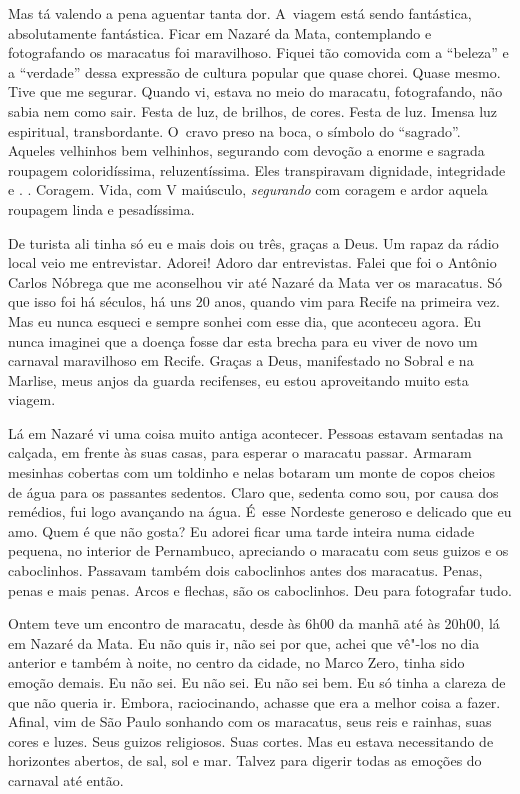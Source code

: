 Mas tá valendo a pena aguentar tanta dor. A~viagem está sendo
fantástica, absolutamente fantástica. Ficar em Nazaré da Mata,
contemplando e fotografando os maracatus foi maravilhoso. Fiquei tão
comovida com a ``beleza'' e a ``verdade'' dessa expressão de cultura
popular que quase chorei. Quase mesmo. Tive que me segurar. Quando vi,
estava no meio do maracatu, fotografando, não sabia nem como sair. Festa
de luz, de brilhos, de cores. Festa de luz. Imensa luz espiritual,
transbordante. O~cravo preso na boca, o símbolo do ``sagrado''. Aqueles
velhinhos bem velhinhos, segurando com devoção a enorme e sagrada
roupagem coloridíssima, reluzentíssima. Eles transpiravam dignidade,
integridade e .  . Coragem. Vida, com V maiúsculo,
\emph{segurando} com coragem e ardor aquela roupagem linda e
pesadíssima.

De turista ali tinha só eu e mais dois ou três, graças a Deus. Um rapaz
da rádio local veio me entrevistar. Adorei! Adoro dar entrevistas. Falei
que foi o Antônio Carlos Nóbrega que me aconselhou vir até Nazaré da
Mata ver os maracatus. Só que isso foi há séculos, há uns 20 anos,
quando vim para Recife na primeira vez. Mas eu nunca esqueci e sempre
sonhei com esse dia, que aconteceu agora. Eu nunca imaginei que a doença
fosse dar esta brecha para eu viver de novo um carnaval maravilhoso em
Recife. Graças a Deus, manifestado no Sobral e na Marlise, meus anjos da
guarda recifenses, eu estou aproveitando muito esta viagem.

Lá em Nazaré vi uma coisa muito antiga acontecer. Pessoas estavam
sentadas na calçada, em frente às suas casas, para esperar o maracatu
passar. Armaram mesinhas cobertas com um toldinho e nelas botaram um
monte de copos cheios de água para os passantes sedentos. Claro que,
sedenta como sou, por causa dos remédios, fui logo avançando na água. É~esse Nordeste generoso e delicado que eu amo. Quem é que não gosta? Eu
adorei ficar uma tarde inteira numa cidade pequena, no interior de
Pernambuco, apreciando o maracatu com seus guizos e os caboclinhos.
Passavam também dois caboclinhos antes dos maracatus. Penas, penas e
mais penas. Arcos e flechas, são os caboclinhos. Deu para fotografar
tudo.

Ontem teve um encontro de maracatu, desde às 6h00 da manhã até às 20h00,
lá em Nazaré da Mata. Eu não quis ir, não sei por que, achei que vê"-los
no dia anterior e também à noite, no centro da cidade, no Marco Zero,
tinha sido emoção demais. Eu não sei. Eu não sei. Eu não sei bem. Eu só
tinha a clareza de que não queria ir. Embora, raciocinando, achasse que
era a melhor coisa a fazer. Afinal, vim de São Paulo sonhando com os
maracatus, seus reis e rainhas, suas cores e luzes. Seus guizos
religiosos. Suas cortes. Mas eu estava necessitando de horizontes
abertos, de sal, sol e mar. Talvez para digerir todas as emoções do
carnaval até então.

